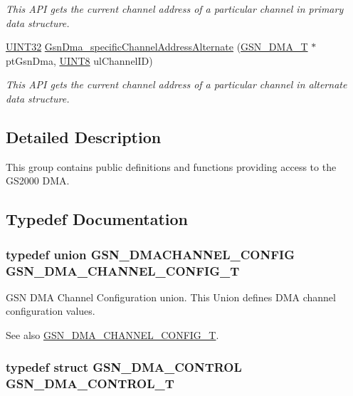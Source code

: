 \begin{DoxyCompactItemize}
\begin{DoxyCompactList}\small\item\em This API gets the current channel address of a particular channel in primary data structure. \end{DoxyCompactList}\item 
\hyperlink{a00660_gae1e6edbbc26d6fbc71a90190d0266018}{UINT32} \hyperlink{a00645_ga9fcb9e0aa7d752da1a090711fbff8a3d}{GsnDma\_\-specificChannelAddressAlternate} (\hyperlink{a00049}{GSN\_\-DMA\_\-T} $\ast$ptGsnDma, \hyperlink{a00660_gab27e9918b538ce9d8ca692479b375b6a}{UINT8} ulChannelID)
\begin{DoxyCompactList}\small\item\em This API gets the current channel address of a particular channel in alternate data structure. \end{DoxyCompactList}\end{DoxyCompactItemize}


\subsection{Detailed Description}
This group contains public definitions and functions providing access to the GS2000 DMA. 

\subsection{Typedef Documentation}
\hypertarget{a00645_ga39663b303d8a6ba93086369a284e1334}{
\subsubsection[{GSN\_\-DMA\_\-CHANNEL\_\-CONFIG\_\-T}]{\setlength{\rightskip}{0pt plus 5cm}typedef union {\bf GSN\_\-DMACHANNEL\_\-CONFIG} {\bf GSN\_\-DMA\_\-CHANNEL\_\-CONFIG\_\-T}}}
\label{a00645_ga39663b303d8a6ba93086369a284e1334}


GSN DMA Channel Configuration union. This Union defines DMA channel configuration values. 

\begin{DoxySeeAlso}{See also}
\hyperlink{a00645_ga39663b303d8a6ba93086369a284e1334}{GSN\_\-DMA\_\-CHANNEL\_\-CONFIG\_\-T}. 
\end{DoxySeeAlso}
\hypertarget{a00645_gad93c4855c9b915891cbdcfcdf2fd0ee5}{
\subsubsection[{GSN\_\-DMA\_\-CONTROL\_\-T}]{\setlength{\rightskip}{0pt plus 5cm}typedef struct {\bf GSN\_\-DMA\_\-CONTROL} {\bf GSN\_\-DMA\_\-CONTROL\_\-T}}}
\label{a00645_gad93c4855c9b915891cbdcfcdf2fd0ee5}


